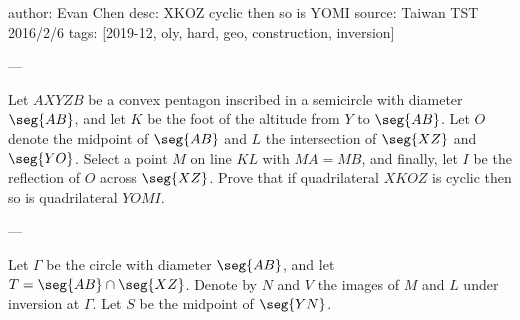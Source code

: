 author: Evan Chen
desc: XKOZ cyclic then so is YOMI
source: Taiwan TST 2016/2/6
tags: [2019-12, oly, hard, geo, construction, inversion]

---

Let $AXYZB$ be a convex pentagon inscribed in a semicircle with diameter $\seg{AB}$, and let $K$ be the foot of the altitude from $Y$ to $\seg{AB}$. Let $O$ denote the midpoint of $\seg{AB}$ and $L$ the intersection of $\seg{XZ}$ and $\seg{YO}$. Select a point $M$ on line $KL$ with $MA=MB$, and finally, let $I$ be the reflection of $O$ across $\seg{XZ}$. Prove that if quadrilateral $XKOZ$ is cyclic then so is quadrilateral $YOMI$.

---

Let $\Gamma$ be the circle with diameter $\seg{AB}$, and let $T=\seg{AB}\cap\seg{XZ}$. Denote by $N$ and $V$ the images of $M$ and $L$ under inversion at $\Gamma$. Let $S$ be the midpoint of $\seg{YN}$.

